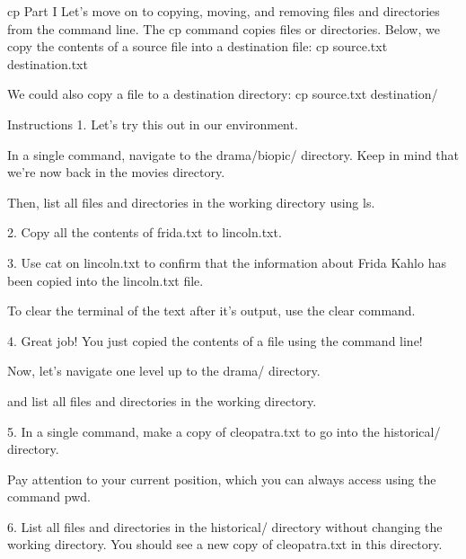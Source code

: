 cp Part I
    Let’s move on to copying, moving, and removing files and directories from the command line. The cp command copies files or directories. Below, we copy the contents of a source file into a destination file:
        cp source.txt destination.txt 
    
    We could also copy a file to a destination directory:
        cp source.txt destination/

Instructions
    1.
    Let’s try this out in our environment.

    In a single command, navigate to the drama/biopic/ directory. Keep in mind that we’re now back in the movies directory.

    Then, list all files and directories in the working directory using ls.

    2.
    Copy all the contents of frida.txt to lincoln.txt.

    3.
    Use cat on lincoln.txt to confirm that the information about Frida Kahlo has been copied into the lincoln.txt file.

    To clear the terminal of the text after it’s output, use the clear command.

    4.
    Great job! You just copied the contents of a file using the command line!

    Now, let’s navigate one level up to the drama/ directory.

    and list all files and directories in the working directory.

    5.
    In a single command, make a copy of cleopatra.txt to go into the historical/ directory.

    Pay attention to your current position, which you can always access using the command pwd.

    6.
    List all files and directories in the historical/ directory without changing the working directory. You should see a new copy of cleopatra.txt in this directory.